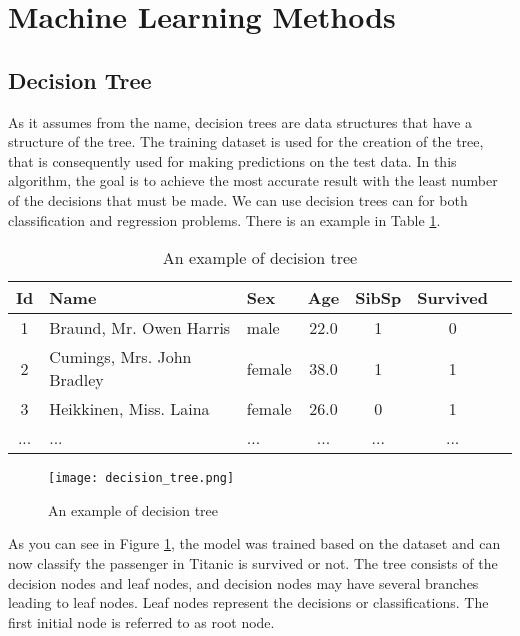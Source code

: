 \section{Machine Learning Methods}

\subsection{Decision Tree}
\label{ssec:decision-tree}

As it assumes from the name, decision trees are data structures that have a structure of the tree. The training dataset is used for the creation of the tree, that is consequently used for making predictions on the test data. In this algorithm, the goal is to achieve the most accurate result with the least number of the decisions that must be made. We can use decision trees can for both classification and regression problems. There is an example in Table \ref{table:decision-tree}.

\begin{table}[h]
\caption{An example of decision tree}
\centering
\label{table:decision-tree}
\begin{tabular}{c l l c c c c}
\hline
Id & Name                       & Sex    & Age  & SibSp & Survived \\	
\hline
1  & Braund, Mr. Owen Harris    & male   & 22.0	& 1     & 0	\\
2  & Cumings, Mrs. John Bradley & female & 38.0	& 1     & 1	\\
3  & Heikkinen, Miss. Laina	    & female & 26.0	& 0     & 1 \\
...& ...                        & ...    & ...  & ...   & ... \\ 
\hline 
\end{tabular}
\end{table}

\begin{figure}[htbp!] 
\centering    
\texttt{[image: decision\_tree.png]}
\caption{An example of decision tree \cite{wikidecisiontree}}
\label{fig:decision-tree}
\end{figure}

As you can see in Figure \ref{fig:decision-tree}, the model was trained based on the dataset and can now classify the passenger in Titanic is survived or not. The tree consists of the decision nodes and leaf nodes, and decision nodes may have several branches leading to leaf nodes. Leaf nodes represent the decisions or classifications. The first initial node is referred to as root node.

